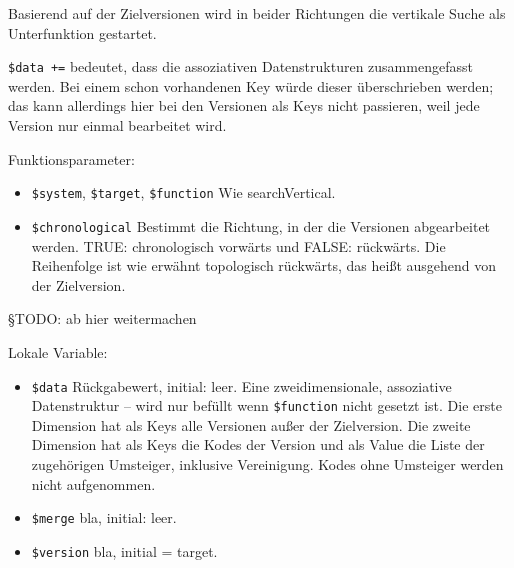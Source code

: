 
Basierend auf der Zielversionen wird in beider Richtungen die vertikale Suche als Unterfunktion gestartet.

\texttt{\$data +=} bedeutet, dass die assoziativen Datenstrukturen zusammengefasst werden. Bei einem schon vorhandenen Key würde dieser überschrieben werden; das kann allerdings hier bei den Versionen als Keys nicht passieren, weil jede Version nur einmal bearbeitet wird. 


Funktionsparameter:

\begin{itemize}
\item \texttt{\$system}, \texttt{\$target}, \texttt{\$function}  \newline Wie searchVertical. 
\item \texttt{\$chronological}
\newline Bestimmt die Richtung, in der die Versionen abgearbeitet werden. TRUE: chronologisch vorwärts und FALSE: rückwärts. Die Reihenfolge ist wie erwähnt topologisch rückwärts, das heißt ausgehend von der Zielversion. 
\end{itemize}

{\color{blue} §TODO: ab hier weitermachen}

Lokale Variable:

\begin{itemize}
\item \texttt{\$data} \hspace{2em} Rückgabewert, initial: leer.
\newline Eine zweidimensionale, assoziative Datenstruktur -- wird nur befüllt wenn \texttt{\$function} nicht gesetzt ist. Die erste Dimension hat als Keys alle Versionen außer der Zielversion. Die zweite Dimension hat als Keys die Kodes der Version und als Value die Liste der zugehörigen Umsteiger, inklusive Vereinigung. Kodes ohne Umsteiger werden nicht aufgenommen.
\item \texttt{\$merge} \newline bla, initial: leer.
\item \texttt{\$version} \newline bla, initial = target.
\end{itemize}

